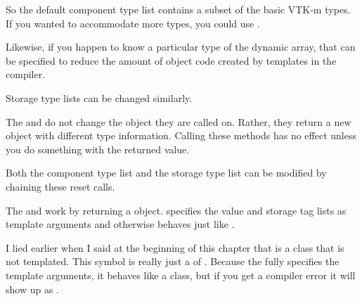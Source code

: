 So the default component type list contains a subset of the basic VTK-m
types. If you wanted to accommodate more types, you could use
.


Likewise, if you happen to know a particular type of the dynamic array,
that can be specified to reduce the amount of object code created by
templates in the compiler.


Storage type lists can be changed similarly.


\begin{commonerrors}
  The  and  do not
  change the object they are called on. Rather, they return a new object
  with different type information. Calling these methods has no effect
  unless you do something with the returned value.
\end{commonerrors}

Both the component type list and the storage type list can be modified by
chaining these reset calls.


The  and  work by
returning a  object.
 specifies the value and storage tag
lists as template arguments and otherwise behaves just like
.

\begin{didyouknow}
  I lied earlier when I said at the beginning of this chapter that
   is a class that is not templated.
  This symbol is really just a  of
  . Because the
   fully specifies the template
  arguments, it behaves like a class, but if you get a compiler error it
  will show up as .
\end{didyouknow}

